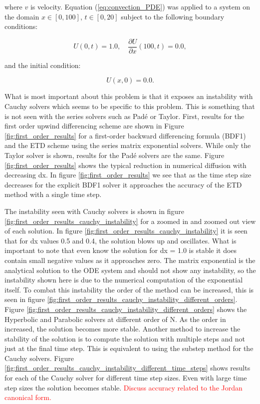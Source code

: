 \noindent where $v$ is velocity. Equation (\ref{eq:convection_PDE}) was applied to a system on the domain $x \in [0, 100]$, $t \in [0, 20]$ subject to the following boundary conditions:

\begin{equation}
    U(0,t) = 1.0, \quad\frac{\partial U}{\partial x}(100, t) = 0.0,
\end{equation}

\noindent and the initial condition:

\begin{equation}
    U(x,0) = 0.0.
\end{equation}

What is most important about this problem is that it exposes an instability with Cauchy solvers which seems to be specific to this problem. This is something that is not seen with the series solvers such as Pad\'e or Taylor. First, results for the first order upwind differencing scheme are shown in Figure \ref{fig:first_order_results}  for a first-order backward differencing formula (BDF1) and the ETD scheme using the series matrix exponential solvers. While only the Taylor solver is shown, results for the Pad\'e solvers are the same. Figure \ref{fig:first_order_results} shows the typical reduction in numerical diffusion with decreasing dx. In figure \ref{fig:first_order_results} we see that as the time step size decreases for the explicit BDF1 solver it approaches the accuracy of the ETD method with a single time step. 

The instability seen with Cauchy solvers is shown in figure \ref{fig:first_order_results_cauchy_instability} for a zoomed in and zoomed out view of each solution. In figure \ref{fig:first_order_results_cauchy_instability} it is seen that for dx values 0.5 and 0.4, the solution blows up and oscillates. What is important to note that even know the solution for dx = 1.0 is stable it does contain small negative values as it approaches zero. The matrix exponential is the analytical solution to the ODE system and should not show any instability, so the instability shown here is due to the numerical computation of the exponential itself. To combat this instability the order of the method can be increased, this is seen in figure \ref{fig:first_order_results_cauchy_instability_different_orders}. Figure \ref{fig:first_order_results_cauchy_instability_different_orders} shows the Hyperbolic and Parabolic solvers at different order of N. As the order in increased, the solution becomes more stable.  Another method to increase the stability of the solution is to compute the solution with multiple steps and not just at the final time step. This is equivalent to using the substep method for the Cauchy solvers. Figure \ref{fig:first_order_results_cauchy_instability_different_time_steps} shows results for each of the Cauchy solver for different time step sizes. Even with large time step sizes the solution becomes stable.   \textcolor{red}{Discuss accuracy related to the Jordan canonical form.}

